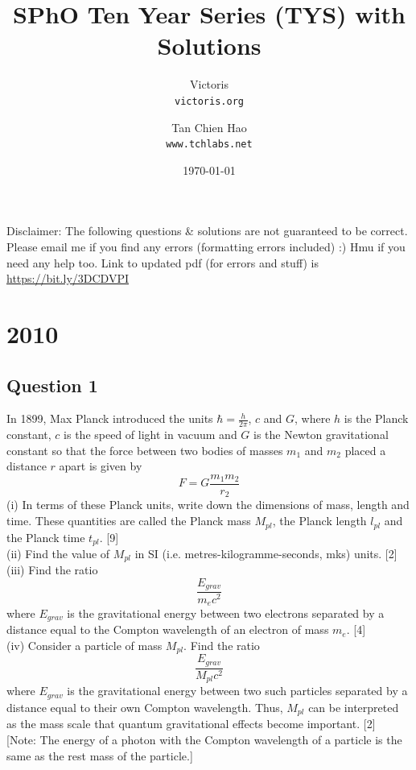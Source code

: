 \documentclass{article}
\title{SPhO Ten Year Series (TYS) with Solutions}
\author{
    Victoris\\
    \texttt{victoris.org}
    \and 
    Tan Chien Hao\\
    \texttt{www.tchlabs.net}
}
\date{\today}
\begin{document}
\maketitle 
	
Disclaimer: The following questions \& solutions are not guaranteed to be correct. Please email me if you find any errors (formatting errors included) :) Hmu if you need any help too. Link to updated pdf (for errors and stuff) is \url{https://bit.ly/3DCDVPI} %

\section{2010}
\subsection{Question 1}
In 1899, Max Planck introduced the units $\hbar=\frac{h}{2\pi}$, $c$ and $G$, where $h$ is the Planck constant, $c$ is the speed of light in vacuum and $G$ is the Newton gravitational constant so that the force between two bodies of masses $m_1$ and $m_2$ placed a distance $r$ apart is given by 
\[F=G\frac{m_1 m_2}{r_2}\]
(i) In terms of these Planck units, write down the dimensions of mass, length and time. These quantities are called the Planck mass $M_{pl}$, the Planck length $l_{pl}$ and the Planck time $t_{pl}$. [9]\\
(ii) Find the value of $M_{pl}$ in SI (i.e. metres-kilogramme-seconds, mks) units. [2] \\
(iii) Find the ratio
 \[\frac{E_{grav}}{m_e c^2}\] where $E_{grav}$ is the gravitational energy between two electrons separated by a distance equal to the Compton wavelength of an electron of mass $m_e$. [4] \\
(iv) Consider a particle of mass $M_{pl}$. Find the ratio \[\frac{E_{grav}}{M_{pl} c^2}\] where $E_{grav}$  is the gravitational energy between two such particles separated by a distance equal to their own Compton wavelength. Thus, $M_{pl}$ can be interpreted as the mass scale that quantum gravitational effects become important. [2] \\

[Note: The energy of a photon with the Compton wavelength of a particle is the same as the rest mass of the particle.] 
\end{document}
